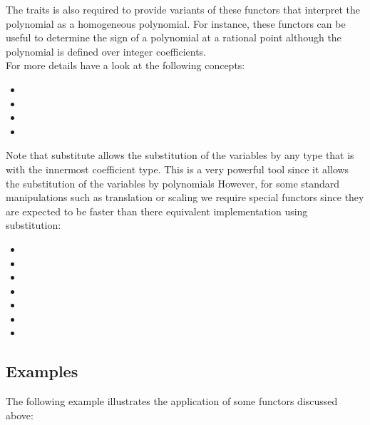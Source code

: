 The traits is also required to provide variants of these functors that interpret the 
polynomial as a homogeneous polynomial. For instance, these functors can be useful 
to determine the sign of a polynomial at a rational point although the polynomial is defined 
over integer coefficients. \\
For more details have a look at the following concepts:
\begin{itemize}
\item {}
\item {}
\item {}
\item {}
\end{itemize}

Note that substitute allows the substitution of the variables by any type that 
is  with the innermost coefficient type. 
This is a very powerful tool since it allows the substitution of the variables by polynomials
However, for some standard manipulations such as translation or scaling we require 
special functors since they are expected to be faster than there equivalent implementation using 
substitution: \\

\begin{itemize}
\item {}
\item {}
\item {}
\item {}
\item {}
\item {}
\item {}
\end{itemize}

\subsection{Examples}   
The following example illustrates the application of some functors discussed above:
